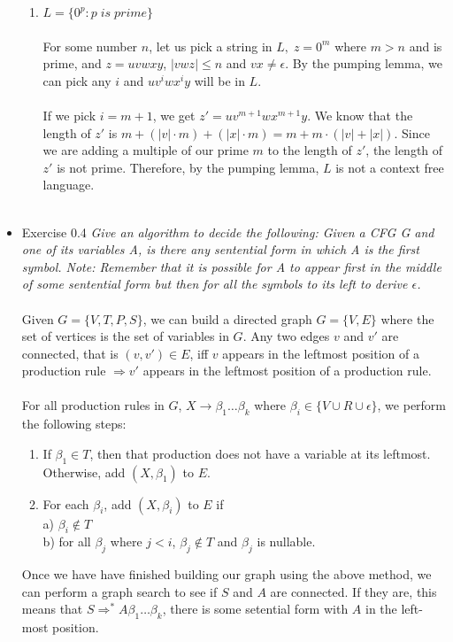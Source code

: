 \documentclass[a4paper]{article}
\begin{document}
\begin{itemize}
\begin{enumerate}
\item $L =\{0^p : p\;is\; prime\}$ \\
\\
For some number $n$, let us pick a string in $L,\;z = 0^m$ where $m > n$ and is prime, and $z = uvwxy$, $|vwz| \leq n$ and $vx \neq \epsilon$. By the pumping lemma, we can pick any $i$ and $uv^iwx^iy$ will be in $L$. \\
\\
If we pick $i = m+1$, we get $z' = uv^{m+1}wx^{m+1}y$. We know that the length of $z'$ is $m+(|v|\cdot m) + (|x|\cdot m) = m + m\cdot(|v| + |x|)$. Since we are adding a multiple of our prime $m$ to the length of $z'$, the length of $z'$ is not prime. Therefore, by the pumping lemma, $L$ is not a context free language. \\
\\


\end{enumerate}

\item{Exercise 0.4} \emph{Give an algorithm to decide the following: Given a CFG G and one of its variables A, is there any sentential form in which A is the first symbol. Note: Remember that it is possible for A to appear first in the middle of some sentential form but then for all the symbols to its left to derive $\epsilon$.} \\
\\
Given $G = \{V, T, P, S\}$, we can build a directed graph $G = \{V,E\}$ where the set of vertices is the set of variables in $G$. Any two edges $v$ and $v'$ are connected, that is $(v, v') \in E$, iff $v$ appears in the leftmost position of a production rule $\Rightarrow v'$ appears in the leftmost position of a production rule.\\
\\
For all production rules in $G$, $X \to \beta_1 \dots \beta_k$ where $\beta_i \in \{V \cup R \cup \epsilon\}$, we perform the following steps: 
\begin{enumerate}
\item If $\beta_1 \in T$, then that production does not have a variable at its leftmost. Otherwise, add $(X, \beta_1)$ to $E$.
\item For each $\beta_i$, add $(X, \beta_i)$ to $E$ if \\
a) $\beta_i \notin T$ \\
b) for all $\beta_j$ where $j < i$, $\beta_j \notin T$ and $\beta_j$ is nullable. 
\end{enumerate}
Once we have have finished building our graph using the above method, we can perform a graph search to see if $S$ and $A$ are connected. If they are, this means that $S \Rightarrow^\ast A\beta_1 \dots \beta_k$, there is some setential form with $A$ in the left-most position.

\end{itemize}
\end{document}
